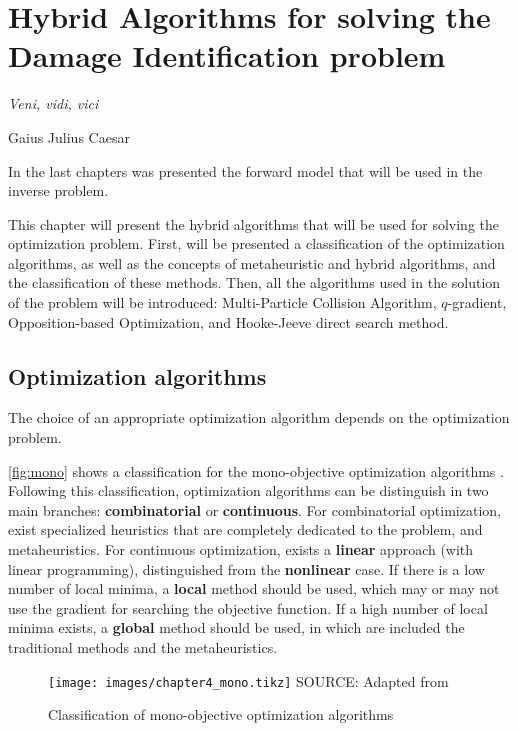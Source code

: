 \chapter{Hybrid Algorithms for solving the Damage Identification problem}
\label{chp:6}
\epigraph{\textit{Veni, vidi, vici}}{Gaius Julius Caesar}

In the last chapters was presented the forward model that will be used in the inverse problem. 

This chapter will present the hybrid algorithms that will be used for solving the optimization problem. First, will be presented a classification of the optimization algorithms, as well as the concepts of metaheuristic and hybrid algorithms, and the classification of these methods. Then, all the algorithms used in the solution of the problem will be introduced: Multi-Particle Collision Algorithm, $q$-gradient, Opposition-based Optimization, and Hooke-Jeeve direct search method.

\section{Optimization algorithms}

The choice of an appropriate optimization algorithm depends on the optimization problem. 

\autoref{fig:mono} shows a classification for the mono-objective optimization algorithms \cite{Siarry2016}. Following this classification, optimization algorithms can be distinguish in two main branches: \textbf{combinatorial} or \textbf{continuous}. For combinatorial optimization, exist specialized heuristics that are completely dedicated to the problem, and metaheuristics. For continuous optimization, exists a \textbf{linear} approach (with linear programming), distinguished from the \textbf{nonlinear} case. If there is a low number of local minima, a \textbf{local} method should be used, which may or may not use the gradient for searching the objective function. If a high number of local minima exists, a \textbf{global} method should be used, in which are included the traditional methods and the metaheuristics.

\begin{figure}[H]
    \caption{Classification of mono-objective optimization algorithms}
    \label{fig:mono}
    \centering
    \texttt{[image: images/chapter4\_mono.tikz]}
    {\footnotesize SOURCE: Adapted from \cite{Siarry2016}}
\end{figure}


